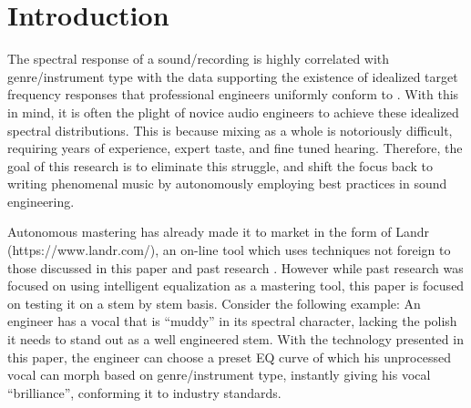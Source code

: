 \documentclass{article}
\title{\papertitle}
\begin{document}
\capstartfalse
\maketitle
\capstarttrue

\begin{abstract}
In this paper, intelligent equalization is implemented using a dynamic IIR filter where the coefficients are generated via the Yule-Walker method.  While in previous research this technique was shown to be an effective form of intelligent mastering, the goal of this paper is to test these methods in a multi-track setting for future implementation in autonomous mixing systems.  In this off-line MATLAB implementation, audio examples are provided to show the result of filtering, and the spectras are compared to objectivley observe the results.  To look at the code used to run this experiment, visit https://github.com/bombsandbottles/Intelligent-Equalization.
\end{abstract}


\section{Introduction}
\label{sec:Introduction}

The spectral response of a sound/recording is highly correlated with genre/instrument type with the data supporting the existence of idealized target frequency responses that professional engineers uniformly conform to \cite{pestana2013spectral}.  With this in mind, it is often the plight of novice audio engineers to achieve these idealized spectral distributions.  This is because mixing as a whole is notoriously difficult, requiring years of experience, expert taste, and fine tuned hearing.  Therefore, the goal of this research is to eliminate this struggle, and shift the focus back to writing phenomenal music by autonomously employing best practices in sound engineering.

Autonomous mastering has already made it to market in the form of Landr (https://www.landr.com/), an on-line tool which uses techniques not foreign to those discussed in this paper and past research \cite{ma2013implementation}.  However while past research was focused on using intelligent equalization as a mastering tool, this paper is focused on testing it on a stem by stem basis.  Consider the following example:  An engineer has a vocal that is ``muddy'' in its spectral character, lacking the polish it needs to stand out as a well engineered stem.  With the technology presented in this paper, the engineer can choose a preset EQ curve of which his unprocessed vocal can morph based on genre/instrument type, instantly giving his vocal ``brilliance'', conforming it to industry standards.
\end{document}
